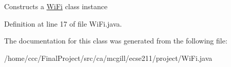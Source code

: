 Constructs a \hyperlink{classca_1_1mcgill_1_1ecse211_1_1project_1_1_wi_fi}{Wi\+Fi} class instance 

Definition at line 17 of file Wi\+Fi.\+java.



The documentation for this class was generated from the following file\+:\begin{DoxyCompactItemize}
\item 
/home/ccc/\+Final\+Project/src/ca/mcgill/ecse211/project/Wi\+Fi.\+java\end{DoxyCompactItemize}
